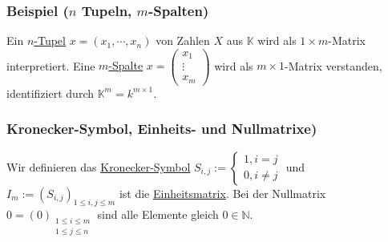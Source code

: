 \subsubsection{Beispiel ($n$ Tupeln, $m$-Spalten)}
Ein \underline{$n$-Tupel} $x=(x_1,\cdots ,x_n)$ von Zahlen $X$ aus $\mathbb{K}$ wird als $1\times m$-Matrix interpretiert.  Eine \underline{$m$-Spalte} $x=\left(\begin{array}{c}x_1\\\vdots \\x_m\end{array}\right)$
wird als $m\times 1$-Matrix verstanden, identifiziert durch $\mathbb{K}^m=k^{m\times 1}$.
\subsubsection{Kronecker-Symbol, Einheits- und Nullmatrixe)}
Wir definieren das \underline{Kronecker-Symbol} $S_{i,j}:=\begin{cases}1,i=j\\0,i\not= j\end{cases}$ und $I_m:=(S_{i,j})_{1\leq i,j\leq m}$ ist die \underline{Einheitsmatrix}.  Bei der Nullmatrix $0=(0)_{\substack{1\leq i\leq m\\1\leq j\leq n}}$ sind alle Elemente gleich $0\in \mathbb{N}$.
